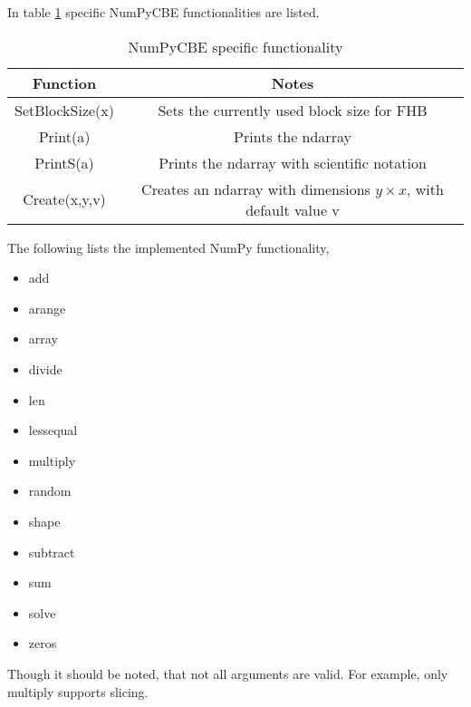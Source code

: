 In table \ref{tbl:numpycbefuncs} specific NumPyCBE functionalities are listed.


\begin{table}
\begin{tabular}{|c|c|}
\hline
Function        & Notes \\
\hline
SetBlockSize(x) & Sets the currently used block size for FHB\\
\hline
Print(a)        & Prints the ndarray\\
\hline
PrintS(a)       & Prints the ndarray with scientific notation\\
\hline
Create(x,y,v)   & Creates an ndarray with dimensions $y \times x$, with default value v\\
\hline
\end{tabular}
\caption{NumPyCBE specific functionality\label{tbl:numpycbefuncs}}
\end{table}

The following lists the implemented NumPy functionality,

\begin{itemize}
\item{add}
\item{arange}
\item{array}
\item{divide}
\item{len}
\item{lessequal}
\item{multiply}
\item{random}
\item{shape}
\item{subtract}
\item{sum}
\item{solve}
\item{zeros}
\end{itemize}

Though it should be noted, that not all arguments are valid. For
example, only multiply supports slicing.




